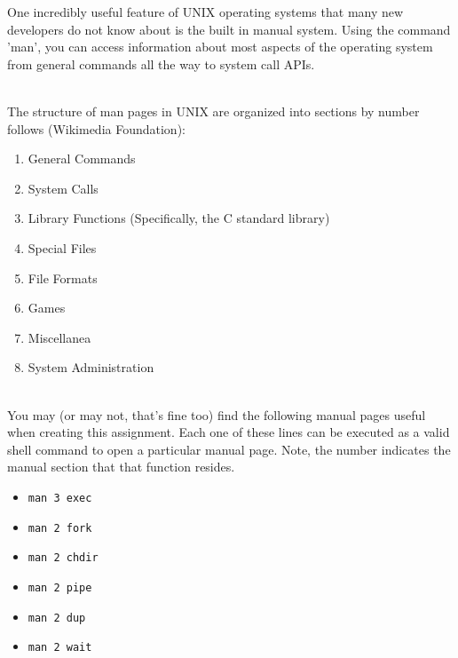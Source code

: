 \documentclass[12pt]{extarticle}
\newenvironment{myindentpar}[1]%
 {\begin{list}{}%
         {\setlength{\leftmargin}{#1}}%
         \item[]%
 }
 {\end{list}}
\newcommand{\code}[1]{\colorbox{codegray}{\texttt{#1}}}
\begin{document}
\begin{myindentpar}{5mm}

    One incredibly useful feature of UNIX operating systems that many new developers do not know about is the built in manual system.  Using the command 'man', you can access information about most aspects of the operating system from general commands all the way to system call APIs.  
    
    \ \\
    The structure of man pages in UNIX are organized into sections by number follows (Wikimedia Foundation):
    \begin{enumerate}
        \setlength\itemsep{-0.1em}
        
        \item General Commands
        \item System Calls
        \item Library Functions (Specifically, the C standard library)
        \item Special Files
        \item File Formats
        \item Games
        \item Miscellanea
        \item System Administration
        
    \end{enumerate}
    
    \ \\
    You may (or may not, that's fine too) find the following manual pages useful when creating this assignment.  Each one of these lines can be executed as a valid shell command to open a particular manual page.  Note, the number indicates the manual section that that function resides.  
    
    \begin{itemize}
        \setlength\itemsep{-0.1em}
    
        \item \code{man 3 exec}
        \item \code{man 2 fork}
        \item \code{man 2 chdir}
        \item \code{man 2 pipe}
        \item \code{man 2 dup}
        \item \code{man 2 wait}
     
    \end{itemize}

\end{myindentpar}
\end{document}

